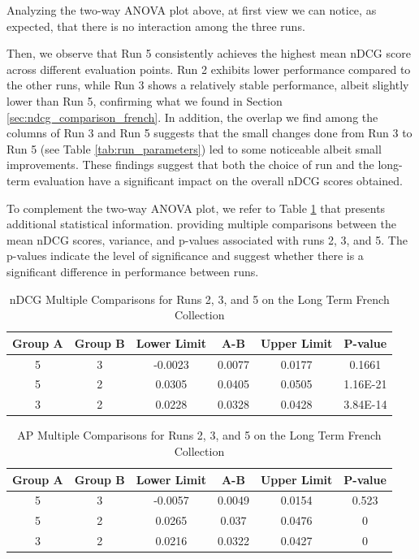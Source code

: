 Analyzing the two-way \ac{ANOVA} plot above, at first view we can notice, as expected, that there is no interaction among the three runs.  

Then, we observe that Run 5 consistently achieves the highest mean \ac{nDCG} score across different evaluation points. 
Run 2 exhibits lower performance compared to the other runs, while Run 3 shows a relatively stable performance, albeit slightly lower than Run 5, confirming what we found in Section \ref{sec:ndcg_comparison_french}.
In addition, the overlap we find among the columns of Run 3 and Run 5 suggests that the small changes done from Run 3 to Run 5 (see Table \ref{tab:run_parameters}) led to some noticeable albeit small improvements. 
These findings suggest that both the choice of run and the long-term evaluation have a significant impact on the overall \ac{nDCG} scores obtained.

To complement the two-way \ac{ANOVA} plot, we refer to Table \ref{table:lt_anova_french} that presents additional statistical information.
providing multiple comparisons between the mean \ac{nDCG} scores, variance, and p-values associated with runs 2, 3, and 5. 
The p-values indicate the level of significance and suggest whether there is a significant difference in performance between runs. 

\begin{table}[!h]
    \centering
    \caption{\ac{nDCG} Multiple Comparisons for Runs 2, 3, and 5 on the Long Term French Collection}
    \label{table:lt_anova_french}
    \begin{tabular}{cccccc}
    \hline
    Group A & Group B & Lower Limit & A-B & Upper Limit & P-value \\ \hline
    5 & 3 & -0.0023 & 0.0077 & 0.0177 & 0.1661 \\
    5 & 2 & 0.0305 & 0.0405 & 0.0505 & 1.16E-21 \\
    3 & 2 & 0.0228 & 0.0328 & 0.0428 & 3.84E-14 \\ \hline
    \end{tabular}
\end{table}

\begin{table}[!h]
    \centering
    \caption{\ac{AP} Multiple Comparisons for Runs 2, 3, and 5 on the Long Term French Collection}
    \label{table:lt_anova_french_ap}
    \begin{tabular}{cccccc}
    \hline
    Group A & Group B & Lower Limit & A-B & Upper Limit & P-value \\ \hline
    5 & 3 & -0.0057 & 0.0049 & 0.0154 & 0.523 \\
    5 & 2 & 0.0265 & 0.037 & 0.0476 & 0 \\
    3 & 2 & 0.0216 & 0.0322 & 0.0427 & 0 \\ \hline
    \end{tabular}
\end{table}

